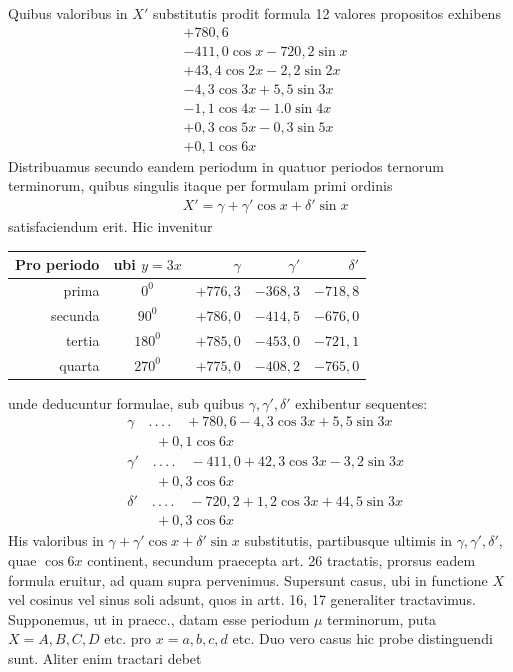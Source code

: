 Quibus valoribus in $X'$ substitutis prodit formula 12 valores propositos exhibens
\[
\begin{aligned}
&+780{,}6\\[5pt]
&-411{,}0\cos x-720{,}2\sin x\\[5pt]
&+43{,}4\cos2x-2{,}2\sin2x\\[5pt]
&-4{,}3\cos3x+5{,}5\sin3x\\[5pt]
&-1{,}1\cos4x-1.0\sin4x\\[5pt]
&+0{,}3\cos5x-0{,}3\sin5x\\[5pt]
&+0{,}1\cos6x
\end{aligned}
\]
Distribuamus secundo eandem periodum in quatuor periodos ternorum terminorum, quibus singulis itaque per formulam primi ordinis
\[
\begin{aligned}
&X'=\gamma+\gamma'\cos x+\delta'\sin x
\end{aligned}
\]
satisfaciendum erit. Hic invenitur
\begin{center}
\begin{tabular}{r|c|r|r|r}
Pro periodo & ubi $y=3x$ & $\gamma$ & $\gamma'$ & $\delta'$\\\hline
prima & $0^{0}$ & $+776{,}3$ & $-368{,}3$ & $-718{,}8$\\
secunda & $90^{0}$ & $+786{,}0$ & $-414{,}5$ & $-676{,}0$\\
tertia & $180^{0}$ & $+785{,}0$ & $-453{,}0$ & $-721{,}1$\\
quarta & $270^{0}$ & $+775{,}0$ & $-408{,}2$ & $-765{,}0$
\end{tabular}
\end{center}
unde deducuntur formulae, sub quibus $\gamma,\gamma',\delta'$ exhibentur sequentes:
\[
\begin{aligned}
&\gamma\quad.\,.\,.\,.\quad+780{,}6-4{,}3\cos3x+5{,}5\sin3x\\[5pt]
&\qquad{}+0{,}1\cos6x\\[5pt]
&\gamma'\quad.\,.\,.\,.\quad-411{,}0+42{,}3\cos3x-3{,}2\sin3x\\[5pt]
&\qquad{}+0{,}3\cos6x\\[5pt]
&\delta'\quad.\,.\,.\,.\quad-720{,}2+1{,}2\cos3x+44{,}5\sin3x\\[5pt]
&\qquad{}+0{,}3\cos6x
\end{aligned}
\]
His valoribus in $\gamma+\gamma'\cos x+\delta'\sin x$ substitutis, partibusque ultimis in $\gamma,\gamma',\delta'$, quae $\cos6x$ continent, secundum praecepta art. 26 tractatis, prorsus eadem formula eruitur, ad quam supra pervenimus.
Supersunt casus, ubi in functione $X$ vel cosinus vel sinus soli adsunt, quos in artt. 16, 17 generaliter tractavimus. Supponemus, ut in praecc., datam esse periodum $\mu$ terminorum, puta $X=A,B,C,D$ etc. pro $x=a,b,c,d$ etc. Duo vero casus hic probe distinguendi sunt. Aliter enim tractari debet


